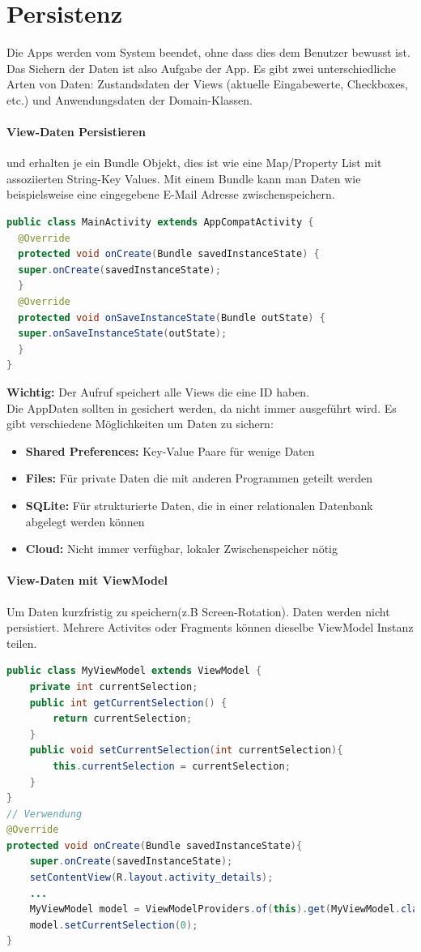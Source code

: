 \section{Persistenz}
Die Apps werden vom System beendet, ohne dass dies dem Benutzer bewusst ist. Das Sichern der Daten ist also Aufgabe der App. Es gibt zwei unterschiedliche Arten von Daten: Zustandsdaten der Views (aktuelle Eingabewerte, Checkboxes, etc.)  und Anwendungsdaten der Domain-Klassen.
\paragraph{View-Daten Persistieren}  und  erhalten je ein Bundle Objekt, dies ist wie eine Map/Property List mit assoziierten String-Key Values. Mit einem Bundle kann man Daten wie beispielsweise eine eingegebene E-Mail Adresse zwischenspeichern.
\begin{lstlisting}[language=java]
public class MainActivity extends AppCompatActivity {
  @Override
  protected void onCreate(Bundle savedInstanceState) {
  super.onCreate(savedInstanceState);
  }
  @Override
  protected void onSaveInstanceState(Bundle outState) {
  super.onSaveInstanceState(outState);
  }
}
\end{lstlisting}
\textbf{Wichtig:} Der  Aufruf speichert alle Views die eine ID haben.\\
Die AppDaten sollten in  gesichert werden, da  nicht immer ausgeführt wird. 
Es gibt verschiedene Möglichkeiten um Daten zu sichern:
\begin{itemize}
\item \textbf{Shared Preferences:} Key-Value Paare für wenige Daten
\item \textbf{Files:} Für private Daten die mit anderen Programmen geteilt werden
\item \textbf{SQLite:} Für strukturierte Daten, die in einer relationalen Datenbank abgelegt werden können
\item \textbf{Cloud:} Nicht immer verfügbar, lokaler Zwischenspeicher nötig
\end{itemize}

\paragraph{View-Daten mit ViewModel}
Um Daten kurzfristig zu speichern(z.B Screen-Rotation). Daten werden nicht persistiert. Mehrere Activites oder Fragments können dieselbe ViewModel Instanz teilen.
\begin{lstlisting}[language=java]
public class MyViewModel extends ViewModel {
    private int currentSelection;
    public int getCurrentSelection() {
        return currentSelection;
    }
    public void setCurrentSelection(int currentSelection){
        this.currentSelection = currentSelection;
    }
}
// Verwendung
@Override
protected void onCreate(Bundle savedInstanceState){
    super.onCreate(savedInstanceState);
    setContentView(R.layout.activity_details);
    ...
    MyViewModel model = ViewModelProviders.of(this).get(MyViewModel.class);
    model.setCurrentSelection(0); 
}
\end{lstlisting}

